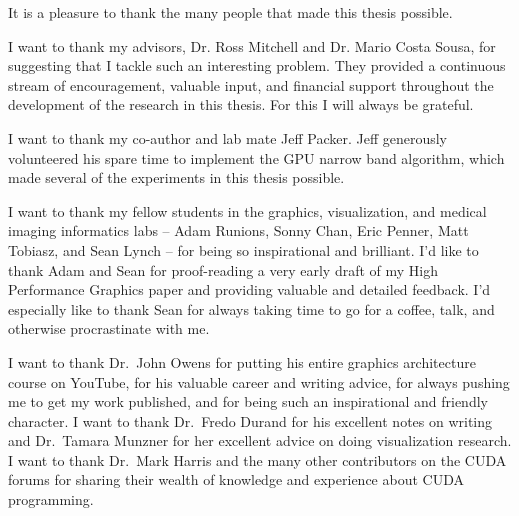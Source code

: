 \newpage
{}
\thispagestyle{plain}

\vspace*{\fill}
\begingroup
\centering

\begin{LARGE}



\end{LARGE}

\endgroup
\vspace*{\fill}

\newpage
{}
{}

\thispagestyle{plain}

It is a pleasure to thank the many people that made this thesis possible.

I want to thank my advisors, Dr. Ross Mitchell and Dr. Mario Costa Sousa, for suggesting that I tackle such an interesting problem. They provided a continuous stream of encouragement, valuable input, and financial support throughout the development of the research in this thesis. For this I will always be grateful.

I  want to thank my co-author and lab mate Jeff Packer. Jeff generously volunteered his spare time to implement the GPU narrow band algorithm, which made several of the experiments in this thesis possible.

I want to thank my fellow students in the graphics, visualization, and medical imaging informatics labs -- Adam Runions, Sonny Chan, Eric Penner, Matt Tobiasz, and Sean Lynch -- for being so inspirational and brilliant. I'd like to thank Adam and Sean for proof-reading a very early draft of my High Performance Graphics paper and providing valuable and detailed feedback. I'd especially like to thank Sean for always taking time to go for a coffee, talk, and otherwise procrastinate with me.

I want to thank Dr.\ John Owens for putting his entire graphics architecture course on YouTube, for his valuable career and writing advice, for always pushing me to get my work published, and for being such an inspirational and friendly character. I want to thank Dr.\ Fredo Durand for his excellent notes on writing and Dr.\ Tamara Munzner for her excellent  advice on doing visualization research. I want to thank Dr.\ Mark Harris and the many other contributors on the CUDA forums for sharing their wealth of knowledge and experience about CUDA programming.

